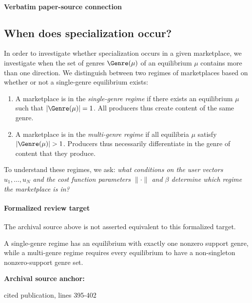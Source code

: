 \documentclass[10pt]{article}
\begin{document}
\paragraph{Verbatim paper-source connection}
\begin{ReviewVerbatim}
\section{When does specialization occur?}\label{sec:specialization}

In order to investigate whether specialization occurs in a given marketplace, we investigate when the set of genres $\Genre(\mu)$ of an equilibrium $\mu$ contains more than one direction. We distinguish between two regimes of marketplaces based on whether or not a single-genre equilibrium exists:
\begin{enumerate}
    \item A marketplace is in the \textit{single-genre regime} if there exists an equilibrium $\mu$ such that $|\Genre(\mu)| = 1$. All producers thus create content of the same genre.
    \item A marketplace is in the \textit{multi-genre regime} if all equilibria $\mu$ satisfy $|\Genre(\mu)| > 1$. Producers thus necessarily differentiate in the genre of content that they produce.
\end{enumerate}
To understand these regimes, we ask: \textit{what conditions on the user vectors $u_1, \ldots, u_N$ and the cost function parameters $\|\cdot \|$ and $\beta$ determine which regime the marketplace is in?}
\end{ReviewVerbatim}


\paragraph{Formalized review target}
The archival source above is not asserted equivalent to this formalized target.
\begin{ReviewVerbatim}
A single-genre regime has an equilibrium with exactly one nonzero support genre, while a multi-genre regime requires every equilibrium to have a non-singleton nonzero-support genre set.
\end{ReviewVerbatim}

\textbf{Archival source anchor:} {\footnotesize\raggedright cited publication, lines 395-\allowbreak{}402\par}
\end{document}
